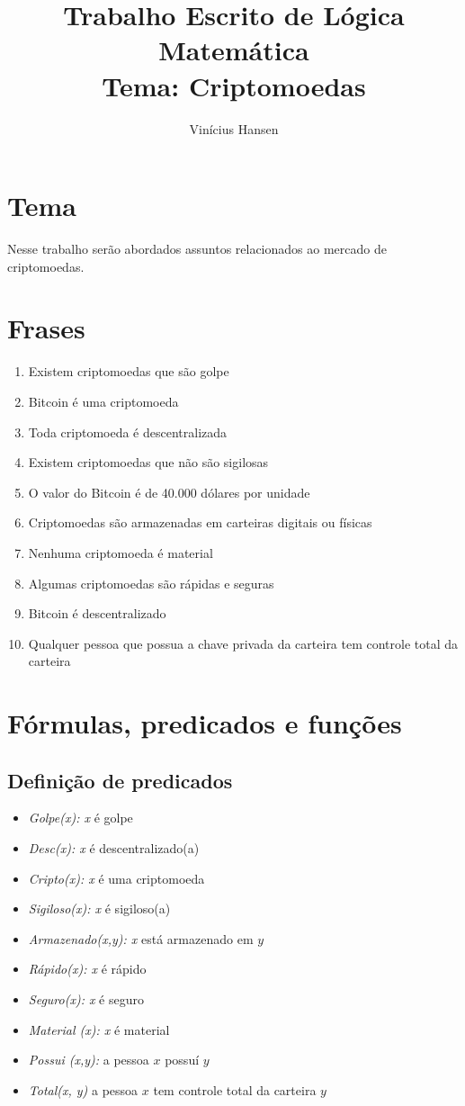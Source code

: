 \documentclass{article}
\author{Vinícius Hansen}
\title{Trabalho Escrito de Lógica Matemática \\ Tema: Criptomoedas}
\date{}
\begin{document}
\maketitle

\section{Tema}
Nesse trabalho serão abordados assuntos relacionados ao mercado de criptomoedas.


\section{Frases}
\begin{enumerate}
    \item Existem criptomoedas que são golpe
    \item Bitcoin é uma criptomoeda
    \item Toda criptomoeda é descentralizada
    \item Existem criptomoedas que não são sigilosas
    \item O valor do Bitcoin é de 40.000 dólares por unidade
    \item Criptomoedas são armazenadas em carteiras digitais ou físicas
    \item Nenhuma criptomoeda é material
    \item Algumas criptomoedas são rápidas e seguras
    \item Bitcoin é descentralizado
    \item Qualquer pessoa que possua a chave privada da carteira tem controle total da carteira
\end{enumerate}


\section{Fórmulas, predicados e funções}

\subsection{Definição de predicados}
\begin{itemize}
    \item \emph{Golpe(x): x} é golpe
    \item \emph{Desc(x): x} é descentralizado(a)
    \item \emph{Cripto(x): x} é uma criptomoeda
    \item \emph{Sigiloso(x): x} é sigiloso(a)
    \item \emph{Armazenado(x,y): x} está armazenado em $y$
    \item \emph{Rápido(x): x} é rápido
    \item \emph{Seguro(x): x} é seguro
    \item \emph{Material (x): x} é material
    \item \emph{Possui (x,y):} a pessoa $x$ possuí $y$
    \item \emph{Total(x, y)} a pessoa $x$ tem controle total da carteira $y$
\end{itemize}
\end{document}
